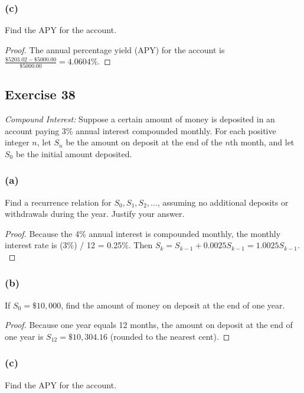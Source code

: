 \documentclass[14pt]{extarticle}
\newcommand{\dps}{\displaystyle}
\begin{document}
    \subsubsection{(c)}
    Find the APY for the account.

    \begin{proof}
        The annual percentage yield (APY) for the account is \(\dps \frac{\$5203.02 - \$5000.00}{\$5000.00} = 4.0604\%\).
    \end{proof}

    \subsection{Exercise 38}
    {\it Compound Interest:} Suppose a certain amount of money is deposited in an account paying 3\% annual interest compounded monthly. For each positive integer $n$, let $S_n$ be the amount on deposit at the end of the $n$th month, and let $S_0$ be the initial amount deposited.

    \subsubsection{(a)}
    Find a recurrence relation for $S_0, S_1, S_2, \ldots$, assuming no additional deposits or withdrawals during the
    year. Justify your answer.

    \begin{proof}
        Because the 4\% annual interest is compounded monthly, the monthly interest rate is (3\%) / 12 = 0.25\%. Then
        \(S_k = S_{k-1} + 0.0025 S_{k - 1} = 1.0025 S_{k-1}.\)
    \end{proof}

    \subsubsection{(b)}
    If $S_0 = \$10,000$, find the amount of money on deposit at the end of one year.

    \begin{proof}
        Because one year equals 12 months, the amount on deposit at the end of one year is \(S_{12} = \$10,304.16\)
        (rounded to the nearest cent).
    \end{proof}

    \subsubsection{(c)}
    Find the APY for the account.
\end{document}
